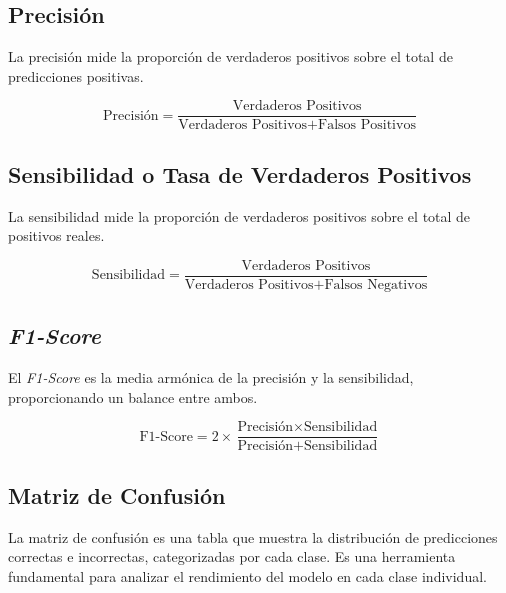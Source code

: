 \documentclass{esannV2}
\begin{document}
\subsection*{Precisión}
La precisión mide la proporción de verdaderos positivos sobre el total de predicciones positivas.

\begin{equation}
\text{Precisión} = \frac{\text{Verdaderos Positivos}}{\text{Verdaderos Positivos} + \text{Falsos Positivos}}
\end{equation}

\subsection*{Sensibilidad o Tasa de Verdaderos Positivos}
La sensibilidad mide la proporción de verdaderos positivos sobre el total de positivos reales.

\begin{equation}
\text{Sensibilidad} = \frac{\text{Verdaderos Positivos}}{\text{Verdaderos Positivos} + \text{Falsos Negativos}}
\end{equation}

\subsection*{\textit{F1-Score}}
El \textit{F1-Score} es la media armónica de la precisión y la sensibilidad, proporcionando un balance entre ambos.

\begin{equation}
\text{F1-Score} = 2 \times \frac{\text{Precisión} \times \text{Sensibilidad}}{\text{Precisión} + \text{Sensibilidad}}
\end{equation}

\subsection*{Matriz de Confusión}
La matriz de confusión es una tabla que muestra la distribución de predicciones correctas e incorrectas, categorizadas por cada clase. Es una herramienta fundamental para analizar el rendimiento del modelo en cada clase individual.
\end{document}
